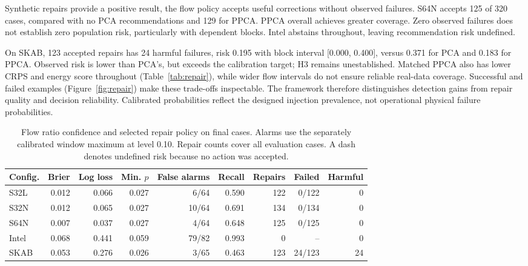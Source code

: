 \documentclass[conference]{IEEEtran}
\newcommand{\1}{\mathbf{1}}
\begin{document}
Synthetic repairs provide a positive result, the flow policy accepts useful corrections without observed failures. S64N accepts 125 of 320 cases, compared with no PCA recommendations and 129 for PPCA. PPCA overall achieves greater coverage. Zero observed failures does not establish zero population risk, particularly with dependent blocks. Intel abstains throughout, leaving recommendation risk undefined.

On SKAB, 123 accepted repairs has 24 harmful failures, risk 0.195 with block interval [0.000, 0.400], versus 0.371 for PCA and 0.183 for PPCA. Observed risk is lower than PCA's, but exceeds the calibration target; H3 remains unestablished. Matched PPCA also has lower CRPS and energy score throughout (Table~\ref{tab:repair}), while wider flow intervals do not ensure reliable real-data coverage. Successful and failed examples (Figure~\ref{fig:repair}) make these trade-offs inspectable. The framework therefore distinguishes detection gains from repair quality and decision reliability. Calibrated probabilities reflect the designed injection prevalence, not operational physical failure probabilities.

\begin{table}[t]
\centering
\caption{Flow ratio confidence and selected repair policy on final cases. Alarms use the separately calibrated window maximum at level 0.10. Repair counts cover all evaluation cases. A dash denotes undefined risk because no action was accepted.}
\label{tab:confidence}
\small
\begin{tabular}{lrrrrrrrr}
\toprule
Config. & Brier & Log loss & Min. $p$ & False alarms & Recall & Repairs & Failed & Harmful \\
\midrule
S32L & 0.012 & 0.066 & 0.027 & 6/64 & 0.590 & 122 & 0/122 & 0 \\
S32N & 0.012 & 0.065 & 0.027 & 10/64 & 0.691 & 134 & 0/134 & 0 \\
S64N & 0.007 & 0.037 & 0.027 & 4/64 & 0.648 & 125 & 0/125 & 0 \\
Intel & 0.068 & 0.441 & 0.059 & 79/82 & 0.993 & 0 & -- & 0 \\
SKAB & 0.053 & 0.276 & 0.026 & 3/65 & 0.463 & 123 & 24/123 & 24 \\
\bottomrule
\end{tabular}
\end{table}
\end{document}
